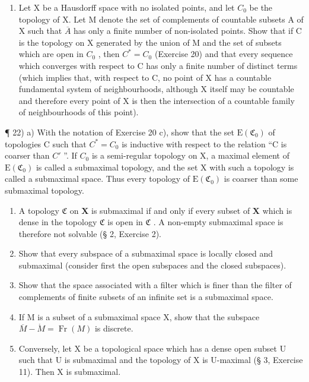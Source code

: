 \begin{enumerate}
\def\labelenumi{\arabic{enumi})}
\setcounter{enumi}{20}
\tightlist
\item
  Let X be a Hausdorff space with no isolated points, and let \(C_{0}\) be the topology of X. Let M denote the set of complements of countable subsets A of X such that \(\overline{A}\) has only a finite number of non-isolated points. Show that if C is the topology on X generated by the union of M and the set of subsets which are open in \(C_{0}\) , then \(C^{*} = C_{0}\) (Exercise 20) and that every sequence which converges with respect to C has only a finite number of distinct terms (which implies that, with respect to C, no point of X has a countable fundamental system of neighbourhoods, although X itself may be countable and therefore every point of X is then the intersection of a countable family of neighbourhoods of this point).
\end{enumerate}

¶ 22) a) With the notation of Exercise 20 c), show that the set \(\mathrm{E}(\mathfrak{C}_{0})\) of topologies C such that \(C^{*}=C_{0}\) is inductive with respect to the relation ``C is coarser than \(C'\) ''. If \(C_{0}\) is a semi-regular topology on X, a maximal element of \(\mathrm{E}(\mathfrak{C}_{0})\) is called a submaximal topology, and the set X with such a topology is called a submaximal space. Thus every topology of \(\mathrm{E}(\mathfrak{C}_{0})\) is coarser than some submaximal topology.

\begin{enumerate}
\def\labelenumi{\alph{enumi})}
\setcounter{enumi}{1}
\item
  A topology \(\mathfrak{C}\) on \(\mathbf{X}\) is submaximal if and only if every subset of \(\mathbf{X}\) which is dense in the topology \(\mathfrak{C}\) is open in \(\mathfrak{C}\) . A non-empty submaximal space is therefore not solvable (§ 2, Exercise 2).
\item
  Show that every subspace of a submaximal space is locally closed and submaximal (consider first the open subspaces and the closed subspaces).
\item
  Show that the space associated with a filter which is finer than the filter of complements of finite subsets of an infinite set is a submaximal space.
\item
  If M is a subset of a submaximal space X, show that the subspace \(\overline{M} - \mathring{M} = \operatorname{Fr}(M)\) is discrete.
\item
  Conversely, let X be a topological space which has a dense open subset U such that U is submaximal and the topology of X is U-maximal (§ 3, Exercise 11). Then X is submaximal.
\end{enumerate}

